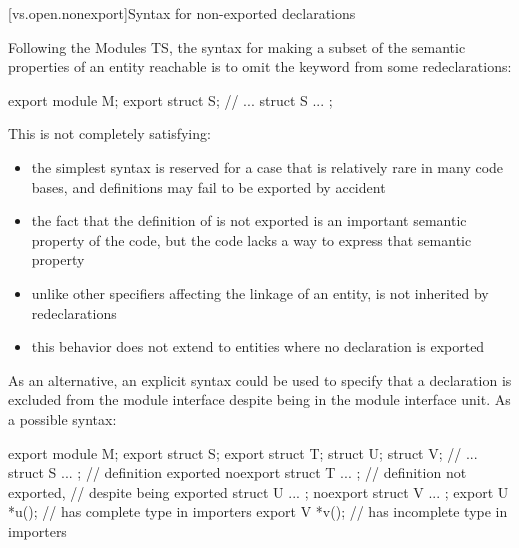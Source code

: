 [vs.open.nonexport]{Syntax for non-exported declarations}

\pnum
Following the Modules TS,
the syntax for making a subset
of the semantic properties of an entity reachable
is to omit the  keyword
from some redeclarations:

\begin{codeblock}
export module M;
export struct S;
// ...
struct S { ... };
\end{codeblock}

\pnum
This is not completely satisfying:
\begin{itemize}
\item the simplest syntax is reserved for a case that is
relatively rare in many code bases, and definitions may
fail to be exported by accident
\item the fact that the definition of  is not exported
is an important semantic property of the code,
but the code lacks a way to express that semantic property
\item unlike other specifiers affecting the linkage
of an entity,  is not inherited by redeclarations
\item this behavior does not extend to entities where
no declaration is exported
\end{itemize}

As an alternative, an explicit syntax could be used
to specify that a declaration is excluded from the module interface
despite being in the module interface unit.
As a possible syntax:

\begin{codeblock}
export module M;
export struct S;
export struct T;
struct U;
struct V;
// ...
struct S { ... };                    // definition exported
noexport struct T { ... };           // definition not exported,
                                     // despite  being exported
struct U { ... };
noexport struct V { ... };
export U *u();                       //  has complete type in importers
export V *v();                       //  has incomplete type in importers
\end{codeblock}
